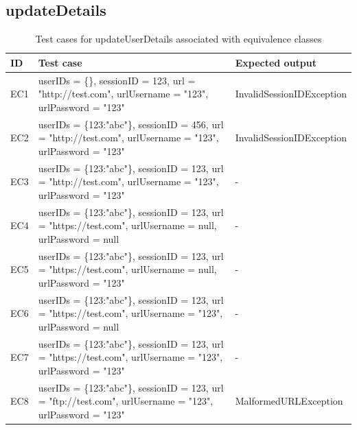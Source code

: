 \documentclass{article}
\begin{document}
\subsection{updateDetails}
\begin{longtable}{|p{2cm}|p{7cm}|p{5cm}|}
\caption{Test cases for updateUserDetails associated with equivalence classes}\\
\hline 
ID&Test case&Expected output\\
\hline  
EC1&userIDs = \{\}, sessionID = 123, url = "http://test.com", urlUsername = "123", urlPassword = "123"&InvalidSessionIDException\\
\hline
EC2&userIDs = \{123:"abc"\}, sessionID = 456, url = "http://test.com", urlUsername = "123", urlPassword = "123"&InvalidSessionIDException\\
\hline
EC3&userIDs = \{123:"abc"\}, sessionID = 123, url = "http://test.com", urlUsername = "123", urlPassword = "123"&-\\
\hline
EC4&userIDs = \{123:"abc"\}, sessionID = 123, url = "https://test.com", urlUsername = null, urlPassword = null&-\\
\hline
EC5&userIDs = \{123:"abc"\}, sessionID = 123, url = "https://test.com", urlUsername = null, urlPassword = "123"&-\\
\hline
EC6&userIDs = \{123:"abc"\}, sessionID = 123, url = "https://test.com", urlUsername = "123", urlPassword = null&-\\
\hline
EC7&userIDs = \{123:"abc"\}, sessionID = 123, url = "https://test.com", urlUsername = "123", urlPassword = "123"&-\\
\hline
EC8&userIDs = \{123:"abc"\}, sessionID = 123, url = "ftp://test.com", urlUsername = "123", urlPassword = "123"&MalformedURLException\\
\hline
\end{longtable}
\end{document}
